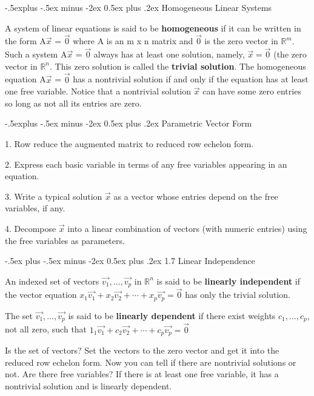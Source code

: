 \documentclass[10pt,landscape]{article}
\makeatletter
\renewcommand{\section}{\@startsection{section}{1}{0mm}%
                                {-.5ex plus -.5ex minus -2ex}%
                                {0.5ex plus .2ex}%
                                {\normalfont\footnotesize\bfseries}}
\renewcommand{\subsection}{\@startsection{subsection}{2}{0mm}%
                                {-.5explus -.5ex minus -2ex}%
                                {0.5ex plus .2ex}%
                                {\normalfont\footnotesize\bfseries}}
\makeatother
\begin{document}
\begin{multicols}{4}
\subsection{Homogeneous Linear Systems}

A system of linear equations is said to be \textbf{homogeneous} if it can be written in the form A$\vec{x}$ = $\vec{0}$ where A is an m x n matrix and $\vec{0}$ is the zero vector in $\mathbb{R}^m$. Such a system A$\vec{x}$ = $\vec{0}$ always has at least one solution, namely, $\vec{x} = \vec{0}$ (the zero vector in $\mathbb{R}^n$. This zero solution is called the \textbf{trivial solution}. The homogeneous equation A$\vec{x}$ = $\vec{0}$ has a nontrivial solution if and only if the equation has at least one free variable. Notice that a nontrivial solution $\vec{x}$ can have some zero entries so long as not all its entries are zero.

\subsection{Parametric Vector Form}

1. Row reduce the augmented matrix to reduced row echelon form.

2. Express each basic variable in terms of any free variables appearing in an equation. 

3. Write a typical solution $\vec{x}$ as a vector whose entries depend on the free variables, if any.

4. Decompose $\vec{x}$ into a linear combination of vectors (with numeric entries) using the free variables as parameters.

\section{1.7 Linear Independence}

An indexed set of vectors {$\vec{v_1},\dots,\vec{v_p}$} in $\mathbb{R}^n$ is said to be \textbf{linearly independent} if the vector equation $x_1\vec{v_1}+x_2\vec{v_2}+\cdots+x_p\vec{v_p} = \vec{0}$ has only the trivial solution.

\medskip

The set {$\vec{v_1},\dots,\vec{v_p}$} is said to be \textbf{linearly dependent} if there exist weights $c_1,\dots,c_p$, not all zero, such that $1_1\vec{v_1}+c_2\vec{v_2}+\cdots+c_p\vec{v_p} = \vec{0}$

\medskip

Is the set of vectors? Set the vectors to the zero vector and get it into the reduced row echelon form.  Now you can tell if there are nontrivial solutions or not. Are there free variables? If there is at least one free variable, it has a nontrivial solution and is linearly dependent. 


\end{multicols}
\end{document}
